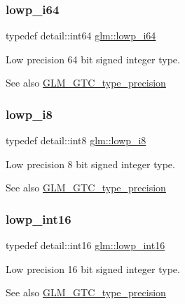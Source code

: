 \subsubsection{\texorpdfstring{lowp\+\_\+i64}{lowp\_i64}}
{\footnotesize\ttfamily typedef detail\+::int64 \hyperlink{group__gtc__type__precision_ga1f4ded25f71c0f3b4518936d50b54b6e}{glm\+::lowp\+\_\+i64}}

Low precision 64 bit signed integer type. \begin{DoxySeeAlso}{See also}
\hyperlink{group__gtc__type__precision}{G\+L\+M\+\_\+\+G\+T\+C\+\_\+type\+\_\+precision} 
\end{DoxySeeAlso}
\mbox{\label{group__gtc__type__precision_gaa2e13ee29c90f75658beed6082541097}} 
\subsubsection{\texorpdfstring{lowp\+\_\+i8}{lowp\_i8}}
{\footnotesize\ttfamily typedef detail\+::int8 \hyperlink{group__gtc__type__precision_gaa2e13ee29c90f75658beed6082541097}{glm\+::lowp\+\_\+i8}}

Low precision 8 bit signed integer type. \begin{DoxySeeAlso}{See also}
\hyperlink{group__gtc__type__precision}{G\+L\+M\+\_\+\+G\+T\+C\+\_\+type\+\_\+precision} 
\end{DoxySeeAlso}
\mbox{\label{group__gtc__type__precision_ga71fc0c399fa4780507748b643733f153}} 
\subsubsection{\texorpdfstring{lowp\+\_\+int16}{lowp\_int16}}
{\footnotesize\ttfamily typedef detail\+::int16 \hyperlink{group__gtc__type__precision_ga71fc0c399fa4780507748b643733f153}{glm\+::lowp\+\_\+int16}}

Low precision 16 bit signed integer type. \begin{DoxySeeAlso}{See also}
\hyperlink{group__gtc__type__precision}{G\+L\+M\+\_\+\+G\+T\+C\+\_\+type\+\_\+precision} 
\end{DoxySeeAlso}
\mbox{\label{group__gtc__type__precision_gae34c3d53c4c1434fc9f26538b0185667}} 
